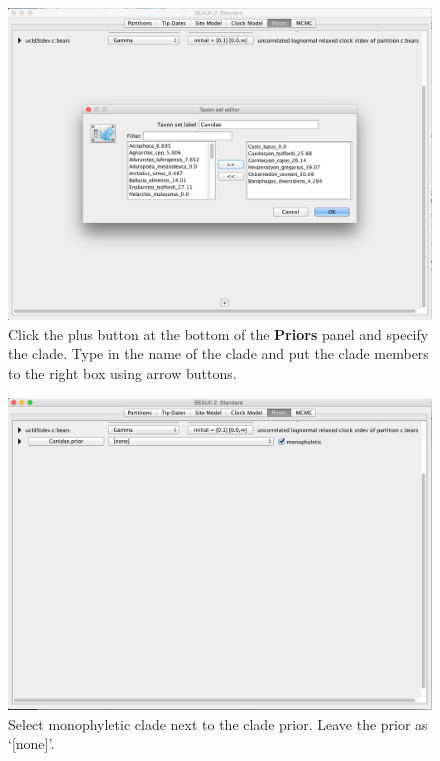 \documentclass[12pt]{article}
\begin{document}
\begin{figure}	
\centering
\includegraphics[width=\textwidth]{figures/MonophyleticClade}
\caption{Click the plus button at the bottom of the {\bf Priors} panel and specify the clade. Type in the name of the clade and put the clade members to the right box using arrow buttons. \label{fig:MonophyleticClade}}
\label{fig:BEAUti_ImportNexus}
\end{figure}

\begin{figure}	
\centering
\includegraphics[width=\textwidth]{figures/MonophyleticConstraint}
\caption{Select monophyletic clade next to the clade prior. Leave the prior as `[none]'. \label{fig:MonophyleticConstraint}}
\label{fig:BEAUti_ImportNexus}
\end{figure}
\end{document}
